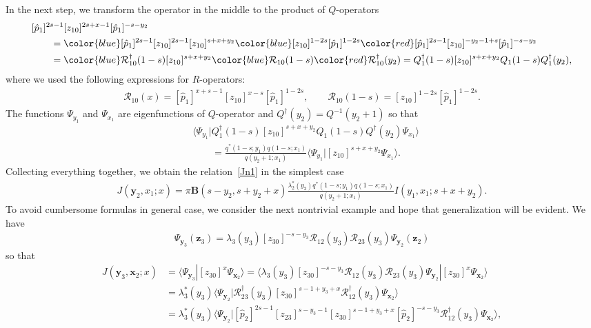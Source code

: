 \documentclass[pdftex]{sigma}
\newcommand{\blue}{\color{blue}}
\newcommand{\red}{\color{red}}
\numberwithin{equation}{section}
\begin{document}
In the next step, we transform the operator in the middle to
the product of $Q$-operators
\begin{align*}
&
[\hat{p}_1]^{2s-1} [z_{10}]^{2s+x-1}
[\hat{p}_1]^{-s-y_2} \\
&
\qquad{}= {\blue[\hat{p}_1]^{2s-1} [z_{10}]^{2s-1}}
[z_{10}]^{s+x+y_2}
{\blue [z_{10}]^{1-2s} [\hat{p}_1]^{1-2s}}
{\red[\hat{p}_1]^{2s-1} [z_{10}]^{-y_2-1+s}
[\hat{p}_1]^{-s-y_2}} \\
&
\qquad{}= {\blue \mathcal{R}^{\dagger}_{10}(1-s)}
[z_{10}]^{s+x+y_2}
{\blue \mathcal{R}_{10}(1-s)} {\red \mathcal{R}^{\dagger}_{10}(y_2)} =
Q^{\dagger}_1(1-s)
[z_{10}]^{s+x+y_2}
Q_1(1-s) Q^{\dagger}_1(y_2) ,
\end{align*}
where we used the following expressions for $R$-operators:
\begin{align*}
\mathcal{R}_{10}(x) =
[\hat{p}_1]^{x+s-1} [z_{10}]^{x-s} [\hat{p}_1]^{1-2s},\qquad
\mathcal{R}_{10}(1-s) = [z_{10}]^{1-2s} [\hat{p}_1]^{1-2s} .
\end{align*}
The functions $\Psi_{y_1}$ and $\Psi_{x_1}$
are eigenfunctions of $Q$-operator and $Q^{\dagger}(y_2) = Q^{-1}(y_2+1)$ so that
\begin{align*}
&
\bigl\langle \Psi_{y_1}|Q^{\dagger}_1(1-s)
[z_{10}]^{s+x+y_2}
Q_1(1-s) Q^{\dagger}(y_2)
\Psi_{x_{1}}\bigr\rangle \\
& \qquad =
\frac{q^*(1-s;y_1) q(1-s;x_1)}
{q(y_2+1;x_1)}
\langle \Psi_{y_1}|[z_{10}]^{s+x+y_2}
\Psi_{x_{1}}\rangle .
\end{align*}
Collecting everything together, we obtain the relation~\eqref{Jn1}
in the simplest case
\begin{align*}
J(\bm{y}_2,x_{1};x) = \pi \mathbf{B}(s-y_2,s+y_2+x)
\frac{\lambda_2^\ast(y_2) q^*(1-s;y_1) q(1-s;x_1)}
{q(y_2+1;x_1)} I(y_1,x_1;s+x+y_2) .
\end{align*}
To avoid cumbersome formulas in general case, we consider the next nontrivial
example and hope that generalization will be evident.
We have
\begin{align*}
\Psi_{\bm{y}_3}(\bm{z}_3) = \lambda_3(y_3)
[z_{30}]^{-s-y_3} \mathcal{R}_{12}(y_3) \mathcal{R}_{23}(y_3)
\Psi_{\bm{y}_2}(\bm{z}_2)
\end{align*}
so that
\begin{align*}
J(\bm{y}_3,\bm{x}_2;x) & =
\langle \Psi_{\bm{y}_3}|[z_{30}]^{x} \Psi_{\bm{x}_2} \rangle =
\langle \lambda_3(y_3) [z_{30}]^{-s-y_3} \mathcal{R}_{12}(y_3)
\mathcal{R}_{23}(y_3) \Psi_{\bm{y}_2}|
[z_{30}]^{x} \Psi_{\bm{x}_2} \rangle \\
& =
\lambda_3^\ast(y_3)
\bigl\langle \Psi_{\bm{y}_2}|
\mathcal{R}^{\dagger}_{23}(y_3)
[z_{30}]^{s-1+y_3+x} \mathcal{R}^{\dagger}_{12}(y_3) \Psi_{\bm{x}_2} \bigr\rangle \\
& =
\lambda_3^\ast(y_3)
\bigl\langle \Psi_{\bm{y}_2}|
[\hat{p}_2]^{2s-1} [z_{23}]^{s-y_3-1} [z_{30}]^{s-1+y_3+x}
[\hat{p}_2]^{-s-y_3}
\mathcal{R}^{\dagger}_{12}(y_3) \Psi_{\bm{x}_2} \bigr\rangle ,
\end{align*}
\end{document}

